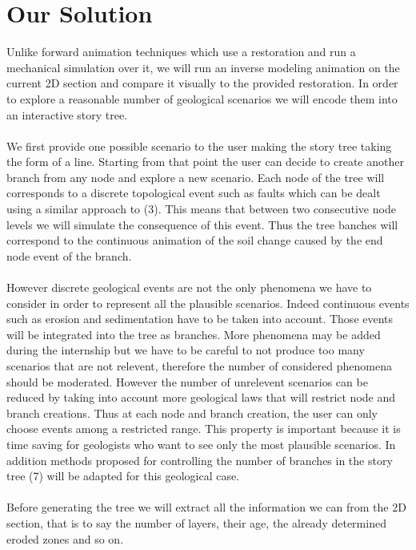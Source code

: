 \documentclass[12pt, a4paper]{memoir} %
\begin{document}
\section{Our Solution}

Unlike forward animation techniques which use a restoration and run a mechanical simulation over it, we will run an inverse modeling animation on the current 2D section and compare it visually to the provided restoration. In order to explore a reasonable number of geological scenarios we will encode them into an interactive story tree.\\\\

We first provide one possible scenario to the user making the story tree taking the form of a line. Starting from that point the user can decide to create another branch from any node and explore a new scenario. Each node of the tree will corresponds to a discrete topological event such as faults which can be dealt using a similar approach to (3). This means that between two consecutive node levels we will simulate the consequence of this event. Thus the tree banches will correspond to the continuous animation of the soil change caused by the end node event of the branch.\\\\

However discrete geological events are not the only phenomena we have to consider in order to represent all the plausible scenarios. Indeed continuous events such as erosion and sedimentation have to be taken into account. Those events will be integrated into the tree as branches.
More phenomena may be added during the internship but we have to be careful to not produce too many scenarios that are not relevent, therefore the number of considered phenomena should be moderated. However the number of unrelevent scenarios can be reduced by taking into account more geological laws that will restrict node and branch creations.
Thus at each node and branch creation, the user can only choose events among a restricted range. This property is important because it is time saving for geologists who want to see only the most plausible scenarios. In addition methods proposed for controlling the number of branches in the story tree (7) will be adapted for this geological case.\\\\

Before generating the tree we will extract all the information we can from the 2D section, that is to say the number of layers, their age, the already determined eroded zones and so on.\\\\
\end{document}
